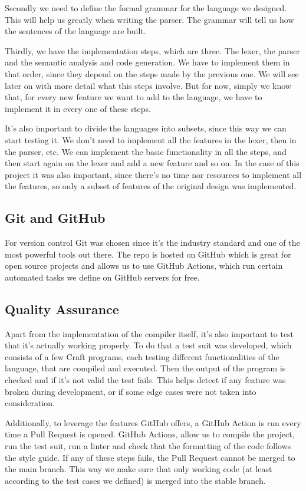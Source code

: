﻿\documentclass[10pt,a4paper,twocolumn,twoside]{article}
\begin{document}
Secondly we need to define the formal grammar for the language we designed. This
will help us greatly when writing the parser. The grammar will tell us how the
sentences of the language are built.

Thirdly, we have the implementation steps, which are three. The lexer, the
parser and the semantic analysis and code generation. We have to implement them
in that order, since they depend on the steps made by the previous one.  We will
see later on with more detail what this steps involve. But for now, simply we
know that, for every new feature we want to add to the language, we have to
implement it in every one of these steps.

It's also important to divide the languages into subsets, since this way we 
can start testing it. We don't need to implement all the features in the lexer,
then in the parser, etc. We can implement the basic functionality in all the 
steps, and then start again on the lexer and add a new feature and so on. In the
case of this project it was also important, since there's no time nor resources
to implement all the features, so only a subset of features of the original 
design was implemented.

\subsection{Git and GitHub}
For version control Git was chosen since it's the industry standard and one of
the most powerful tools out there. The repo is hosted on GitHub which is great
for open source projects and allows us to use GitHub Actions, which run certain
automated tasks we define on GitHub servers for free.

\subsection{Quality Assurance}
Apart from the implementation of the compiler itself, it's also important to 
test that it's actually working properly. To do that a test suit was developed,
which consists of a few Craft programs, each testing different functionalities 
of the language, that are compiled and executed. Then the output of the program 
is checked and if it's not valid the test fails. This helps detect if any 
feature was broken during development, or if some edge cases were not taken into
consideration.

Additionally, to leverage the features GitHub offers, a GitHub Action is run 
every time a Pull Request is opened. GitHub Actions, allow us to compile the 
project, run the test suit, run a linter and check that the formatting of the 
code follows the style guide. If any of these steps fails, the Pull Request
cannot be merged to the main branch. This way we make sure that only working 
code (at least according to the test cases we defined) is merged into the stable 
branch.
\end{document}
